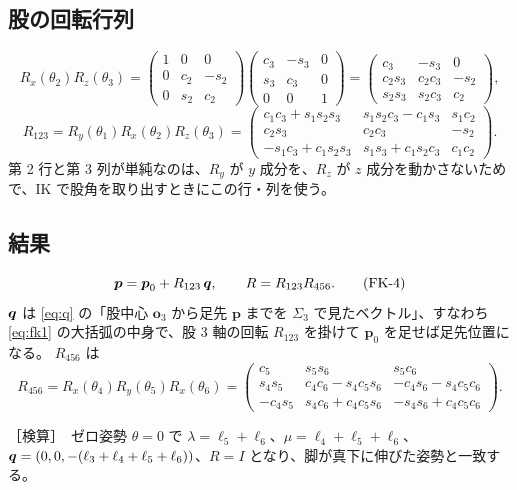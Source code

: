 \documentclass[a4paper,11pt]{ltjsarticle}
\newcommand{\ck}[1]{\begin{shaded}\noindent［検算］\ #1\end{shaded}}
\newcommand{\Rx}{R_x}\newcommand{\Ry}{R_y}\newcommand{\Rz}{R_z}
\newcommand{\bp}{\boldsymbol{p}}\newcommand{\bo}{\boldsymbol{o}}\newcommand{\br}{\boldsymbol{r}}
\newcommand{\cs}[1]{c_{#1}}\newcommand{\sn}[1]{s_{#1}}
\begin{document}
\subsection{股の回転行列}
\begin{equation}
\Rx(\theta_2)\Rz(\theta_3)=
\begin{pmatrix}1&0&0\\0&\cs2&-\sn2\\0&\sn2&\cs2\end{pmatrix}
\begin{pmatrix}\cs3&-\sn3&0\\\sn3&\cs3&0\\0&0&1\end{pmatrix}
=\begin{pmatrix}\cs3&-\sn3&0\\\cs2\sn3&\cs2\cs3&-\sn2\\\sn2\sn3&\sn2\cs3&\cs2\end{pmatrix},
\end{equation}
\begin{equation}
R_{123}=\Ry(\theta_1)\Rx(\theta_2)\Rz(\theta_3)
=\begin{pmatrix}
\cs1\cs3+\sn1\sn2\sn3 & \sn1\sn2\cs3-\cs1\sn3 & \sn1\cs2\\
\cs2\sn3 & \cs2\cs3 & -\sn2\\
-\sn1\cs3+\cs1\sn2\sn3 & \sn1\sn3+\cs1\sn2\cs3 & \cs1\cs2
\end{pmatrix}.
\tag{FK-3}\label{eq:R123}
\end{equation}
第 2 行と第 3 列が単純なのは、$\Ry$ が $y$ 成分を、$\Rz$ が $z$ 成分を動かさないためで、IK で股角を取り出すときにこの行・列を使う。

\subsection{結果}
\begin{equation}
\bp=\bp_0+R_{123}\,\bq,\qquad R=R_{123}R_{456}.
\tag{FK-4}\label{eq:fk4}
\end{equation}
$\boldsymbol{q}$ は \eqref{eq:q} の「股中心 $\bo_3$ から足先 $\bp$ までを $\Sigma_3$ で見たベクトル」、すなわち \eqref{eq:fk1} の大括弧の中身で、股 3 軸の回転 $R_{123}$ を掛けて $\bp_0$ を足せば足先位置になる。
$R_{456}$ は
\begin{equation}
R_{456}=\Rx(\theta_4)\Ry(\theta_5)\Rx(\theta_6)
=\begin{pmatrix}
\cs5 & \sn5\sn6 & \sn5\cs6\\
\sn4\sn5 & \cs4\cs6-\sn4\cs5\sn6 & -\cs4\sn6-\sn4\cs5\cs6\\
-\cs4\sn5 & \sn4\cs6+\cs4\cs5\sn6 & -\sn4\sn6+\cs4\cs5\cs6
\end{pmatrix}.
\tag{FK-5}\label{eq:R456}
\end{equation}
\ck{ゼロ姿勢 $\theta=0$ で $\lambda=\ell_5+\ell_6$、$\mu=\ell_4+\ell_5+\ell_6$、$\boldsymbol{q}=(0,0,-(\ell_3+\ell_4+\ell_5+\ell_6))$、$R=I$ となり、脚が真下に伸びた姿勢と一致する。}
\end{document}

